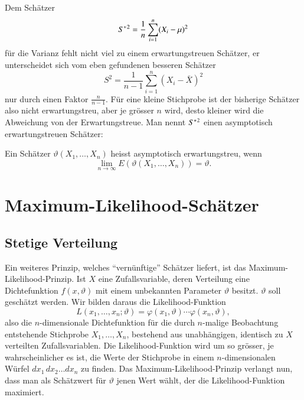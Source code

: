 Dem Schätzer
\begin{equation}
S^{*}\mathstrut^{2}=\frac1n\sum_{i=1}^n(X_i-\mu)^2
\end{equation}
für die Varianz fehlt nicht viel zu einem erwartungstreuen Schätzer,
er unterscheidet sich vom eben gefundenen besseren Schätzer
\begin{equation}
S^2=\frac1{n-1}\sum_{i=1}^n(X_i-\bar X)^2
\end{equation}
nur durch einen Faktor $\frac{n}{n-1}$.
Für eine kleine Stichprobe ist
der bisherige Schätzer also nicht erwartungstreu, aber je grösser $n$
wird, desto kleiner wird die Abweichung von der Erwartungstreue.
Man
nennt $S^{*}\mathstrut^{2}$ einen asymptotisch erwartungstreuen Schätzer:
\begin{definition}
Ein Schätzer $\vartheta(X_1,\dots,X_n)$ heisst asymptotisch erwartungstreu,
wenn
\begin{equation}
\lim_{n\to\infty}E(\vartheta(X_1,\dots,X_n))=\vartheta.
\end{equation}
\end{definition}

\section{Maximum-Likelihood-Schätzer} \label{section-maximum-likelihood-schaetzer}
\subsection{Stetige Verteilung}
Ein weiteres Prinzip, welches ``vernünftige'' Schätzer liefert,
ist das Maximum-Likelihood-Prinzip.
Ist $X$ eine Zufallsvariable, deren
Verteilung eine Dichtefunktion $f(x,\vartheta)$ mit einem unbekannten
Parameter $\vartheta$ besitzt. $\vartheta$ soll geschätzt werden.
Wir bilden daraus die Likelihood-Funktion
\begin{equation}
L(x_1,\dots,x_n;\vartheta)=\varphi(x_1,\vartheta)\cdots \varphi(x_n,\vartheta),
\label{likelihood-funktion}
\end{equation}
also die $n$-dimensionale Dichtefunktion für die durch $n$-malige 
Beobachtung entstehende Stichprobe $X_1,\dots,X_n$, bestehend aus
unabhängigen, identisch zu $X$ verteilten Zufallsvariablen.
Die Likelihood-Funktion wird um so grösser, je wahrscheinlicher
es ist, die Werte der Stichprobe in einem $n$-dimensionalen Würfel
$dx_1\,dx_2\dots dx_n$ zu finden.
Das Maximum-Likelihood-Prinzip
verlangt nun, dass man als Schätzwert für $\vartheta$ jenen Wert
wählt, der die Likelihood-Funktion maximiert.

